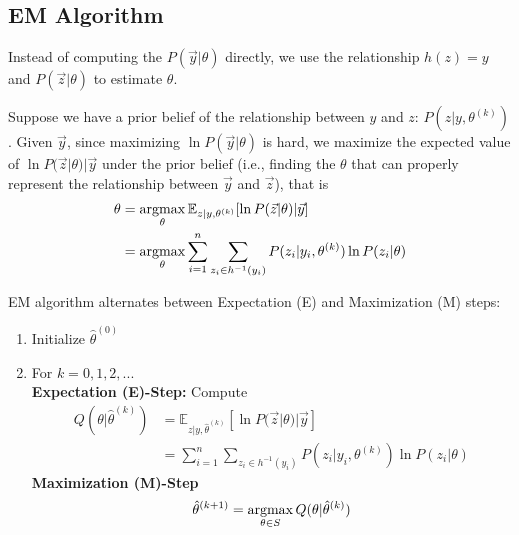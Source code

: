 \documentclass[11pt]{elegantbook}
\newcommand{\argmax}{\operatornamewithlimits{argmax}}
\begin{document}
\subsection*{EM Algorithm}
Instead of computing the $P(\vec{y}|\theta)$ directly, we use the relationship $h(z)=y$ and $P(\vec{z}|\theta)$ to estimate $\theta$.

Suppose we have a prior belief of the relationship between $y$ and $z$: $P(z|y,\theta^{(k)})$. Given $\vec{y}$, since maximizing $\ln P(\vec{y}|\theta)$ is hard, we maximize the expected value of $\ln P(\vec{z}|\theta)|\vec{y}$ under the prior belief (i.e., finding the $\theta$ that can properly represent the relationship between $\vec{y}$ and $\vec{z}$), that is
\begin{equation}
    \begin{aligned}
        \theta&=\argmax_\theta \mathbb{E}_{z|y,\theta^{(k)}} [\ln P(\vec{z}|\theta)|\vec{y}]\\
        &=\argmax_\theta\sum_{i=1}^n \sum_{z_i\in h^{-1}(y_i)}P(z_i|y_i,\theta^{(k)})\ln P(z_i|\theta)
    \end{aligned}
    \nonumber
\end{equation}

EM algorithm alternates between Expectation (E) and Maximization (M) steps:
\begin{enumerate}
    \item Initialize $\hat{\theta}^{(0)}$
    \item For $k=0,1,2,...$\\
    \textbf{Expectation (E)-Step:}
        Compute
        \begin{equation}
            \begin{aligned}
                Q(\theta|\hat{\theta}^{(k)})
                &=\mathbb{E}_{z|y,\hat{\theta}^{(k)}}[\ln P(\vec{z}|\theta)|\vec{y}]\\
                &=\sum_{i=1}^n \sum_{z_i\in h^{-1}(y_i)}P(z_i|y_i,\theta^{(k)})\ln P(z_i|\theta)
            \end{aligned}
            \nonumber
        \end{equation}
    \textbf{Maximization (M)-Step} $$\hat{\theta}^{(k+1)}=\argmax_{\theta\in S}Q(\theta|\hat{\theta}^{(k)})$$
\end{enumerate}
\end{document}
